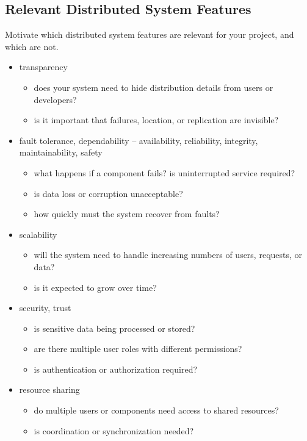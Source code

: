 \documentclass{scrartcl}
\begin{document}
\subsection{Relevant Distributed System Features}
\label{ds-features}

Motivate which distributed system features are relevant for your project, and which are not.
%
\begin{itemize}
  \item transparency
  \begin{itemize}
    \item does your system need to hide distribution details from users or developers?
    \item is it important that failures, location, or replication are invisible?
  \end{itemize}

  \item fault tolerance, dependability -- availability, reliability, integrity, maintainability, safety
  \begin{itemize}
    \item what happens if a component fails? is uninterrupted service required?
    \item is data loss or corruption unacceptable?
    \item how quickly must the system recover from faults?
  \end{itemize}

  \item scalability
  \begin{itemize}
    \item will the system need to handle increasing numbers of users, requests, or data?
    \item is it expected to grow over time?
  \end{itemize}

  \item security, trust
  \begin{itemize}
    \item is sensitive data being processed or stored?
    \item are there multiple user roles with different permissions?
    \item is authentication or authorization required?
  \end{itemize}

  \item resource sharing
  \begin{itemize}
    \item do multiple users or components need access to shared resources?
    \item is coordination or synchronization needed?
  \end{itemize}


\end{itemize}
\end{document}
